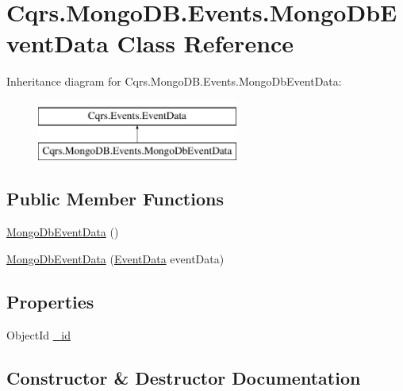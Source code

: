 \hypertarget{classCqrs_1_1MongoDB_1_1Events_1_1MongoDbEventData}{}\section{Cqrs.\+Mongo\+D\+B.\+Events.\+Mongo\+Db\+Event\+Data Class Reference}
\label{classCqrs_1_1MongoDB_1_1Events_1_1MongoDbEventData}
Inheritance diagram for Cqrs.\+Mongo\+D\+B.\+Events.\+Mongo\+Db\+Event\+Data\+:\begin{figure}[H]
\begin{center}
\leavevmode
\includegraphics[height=2.000000cm]{classCqrs_1_1MongoDB_1_1Events_1_1MongoDbEventData}
\end{center}
\end{figure}
\subsection*{Public Member Functions}
\begin{DoxyCompactItemize}
\item 
\hyperlink{classCqrs_1_1MongoDB_1_1Events_1_1MongoDbEventData_a3e0d14163cbc3e11505d63b15ddd1337}{Mongo\+Db\+Event\+Data} ()
\item 
\hyperlink{classCqrs_1_1MongoDB_1_1Events_1_1MongoDbEventData_acdd39bdfc67a9becd0734f4bf056b74b}{Mongo\+Db\+Event\+Data} (\hyperlink{classCqrs_1_1Events_1_1EventData}{Event\+Data} event\+Data)
\end{DoxyCompactItemize}
\subsection*{Properties}
\begin{DoxyCompactItemize}
\item 
Object\+Id \hyperlink{classCqrs_1_1MongoDB_1_1Events_1_1MongoDbEventData_a5650b3e9bac3dd255e8267394e67749a}{\+\_\+id}
\end{DoxyCompactItemize}


\subsection{Constructor \& Destructor Documentation}
\mbox{\label{classCqrs_1_1MongoDB_1_1Events_1_1MongoDbEventData_a3e0d14163cbc3e11505d63b15ddd1337}} 
